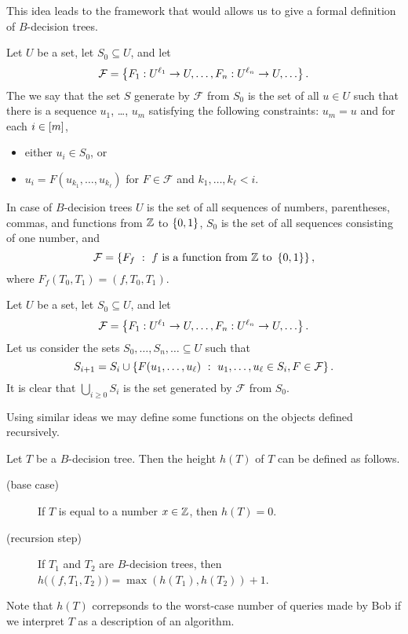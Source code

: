 This idea leads to the framework that would allows us to give a formal
definition of $B$-decision trees.
\begin{definition}
  Let $U$ be a set, let $S_0 \subseteq U$, and let
  \[
    \mathcal{F} =
    \set{F_1 : U^{\ell_1} \to U, \dots, F_n : U^{\ell_n} \to U, \dots}.
  \]
  The we say that the set $S$ generate by $\mathcal{F}$ from $S_0$ is
  the set of all $u \in U$ such that there is a sequence
  $u_1$, \dots, $u_m$ satisfying the following constraints: $u_m = u$ and
  for each $i \in {[{m}]}$,
  \begin{itemize}
    \item either $u_i \in S_0$, or
    \item $u_i = F(u_{k_1}, \dots, u_{k_\ell})$
      for $F \in \mathcal{F}$ and $k_1, \dots, k_\ell < i$.
  \end{itemize}
\end{definition}
In case of $B$-decision trees $U$ is the set of all sequences of numbers,
parentheses, commas, and functions from ${\mathbb{Z}}$ to $\set{0, 1}$,
$S_0$ is the set of all sequences consisting of one number, and
\[
  \mathcal{F} =
  \set[
    {
      f \text{ is a function from } \Z
        \text{ to } \set{0, 1}
    }
  ]{F_f},
\]
where $F_f(T_0, T_1) = (f, T_0, T_1)$.

\begin{remark}
  Let $U$ be a set, let $S_0 \subseteq U$, and let
  \[
    \mathcal{F} =
    \set{F_1 : U^{\ell_1} \to U, \dots, F_n : U^{\ell_n} \to U, \dots}.
  \]
  Let us consider the sets $S_0, \dots, S_n, \dots \subseteq U$ such that 
  \[
    S_{i + 1} = S_i \cup 
    \set[u_1, \dots, u_\ell \in S_i, F \in \mathcal{F}]{F(u_1, \dots, u_\ell)}.
  \]
  It is clear that $\bigcup_{i \ge 0} S_i$ is the set generated by $\mathcal{F}$
  from $S_0$.
\end{remark}

Using similar ideas we may define some functions on the objects defined
recursively.
\begin{definition}
  Let $T$ be a $B$-decision tree. Then the height $h(T)$ of $T$ can be
  defined as follows.
  \begin{description}
    \item [(base case)] If $T$ is equal to a number $x \in {\mathbb{Z}}$, then $h(T) = 0$.
    \item[(recursion step)] If $T_1$ and $T_2$ are $B$-decision trees, then
      $h\big((f, T_1, T_2)\big) = \max(h(T_1), h(T_2)) + 1$.
  \end{description}
\end{definition}
Note that $h(T)$ correpsonds to the worst-case number of queries made by Bob if
we interpret $T$ as a description of an algorithm.

